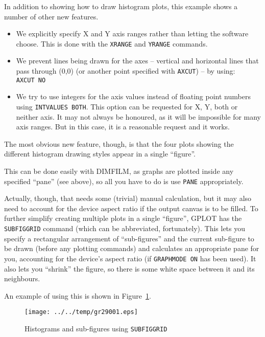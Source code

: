 \documentclass[a4paper,twoside,11pt]{article}
\makeatletter
\def\maxwidth{%
  \ifdim\Gin@nat@width>\linewidth
    \linewidth
  \else
    \Gin@nat@width
  \fi
}
\newcommand{\newpara}{\par\vspace{4mm}\noindent}
\makeatother
\begin{document}
\newpara
In addition to showing how to draw histogram plots, this example shows a
number of other new features.

\begin{itemize}
\item
  We explicitly specify X and Y axis ranges rather than letting the
  software choose. This is done with the \texttt{XRANGE} and
  \texttt{YRANGE} commands.
\item
  We prevent lines being drawn for the axes -- vertical and horizontal
  lines that pass through (0,0) (or another point specified with
  \texttt{AXCUT}) -- by using: \texttt{AXCUT\ NO}
\item
  We try to use integers for the axis values instead of floating point
  numbers using \texttt{INTVALUES\ BOTH}. This option can be requested
  for X, Y, both or neither axis. It may not always be honoured, as it
  will be impossible for many axis ranges. But in this case, it is a
  reasonable request and it works.
\end{itemize}

\newpara
The most obvious new feature, though, is that the four plots showing the
different histogram drawing styles appear in a single ``figure''.

\newpara
This can be done easily with DIMFILM, as graphs are plotted inside any
specified ``pane'' (see above), so all you have to do is use
\texttt{PANE} appropriately.

\newpara
Actually, though, that needs some (trivial) manual calculation, but it
may also need to account for the device aspect ratio if the output
canvas is to be filled. To further simplify creating multiple plots in a
single ``figure'', GPLOT has the \texttt{SUBFIGGRID} command (which can
be abbreviated, fortunately). This lets you specify a rectangular
arrangement of ``sub-figures'' and the current sub-figure to be drawn
(before any plotting commands) and calculates an appropriate pane for
you, accounting for the device's aspect ratio (if \texttt{GRAPHMODE\ ON}
has been used). It also lets you ``shrink'' the figure, so there is some
white space between it and its neighbours.

\newpara
An example of using this is shown in Figure~\ref{fig:gr29001}.

\begin{figure}
  \centering
  \texttt{[image: ../../temp/gr29001.eps]}
  \caption{Histograms and sub-figures using \texttt{SUBFIGGRID}}
  \label{fig:gr29001}
\end{figure}
\end{document}

